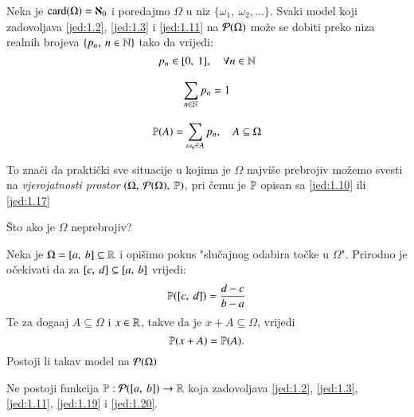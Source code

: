 \begin{pr} \label{pr:1.14}
    Neka je $\textnormal{card}({\Omega}) = \aleph_0$ i poredajmo $\Omega$ u niz $\{ \omega_1, \: \omega_2, \dots \}$.
    Svaki model koji zadovoljava \eqref{jed:1.2}, \eqref{jed:1.3} i \eqref{jed:1.11} na $\mathcal{P}({\Omega})$ mo\v ze se dobiti preko niza realnih brojeva $\{p_n, \: n \in \mathbb{N} \}$ tako da vrijedi:
    \begin{equation}   %
        p_n \in [0, \: 1], \quad \forall n \in \N
    \end{equation}

    \begin{equation}
        \sum\limits_{n \in \mathbb{N}}^{} p_n = 1
    \end{equation}

    \begin{equation} \label{jed:1.17}
        \mathbb{P}({A}) = \sum\limits_{\omega_n \in A}^{} p_n, \quad A
            \subseteq \Omega
    \end{equation}
\end{pr}

To zna\v ci da prakti\v cki sve situacije u kojima je $\Omega$ najvi\v se prebrojiv mo\v zemo svesti na \emph{vjerojatnosti prostor} $(\Omega, \: \mathcal{P}({\Omega}), \: \mathbb{P})$, pri \v cemu je $\mathbb{P}$ opisan sa \eqref{jed:1.10} ili \eqref{jed:1.17}

\v Sto ako je $\Omega$ neprebrojiv?

\begin{pr}  \label{pr:1.18}
    Neka je $\Omega = [{a}, \:{b}] \subseteq \mathbb{R}$ i opi\v simo pokus "slu\v cajnog odabira to\v cke u $\Omega$".
    Prirodno je o\v cekivati da za $[{c}, \:{d}] \subseteq [{a}, \:{b}]$ vrijedi:
    \begin{equation} \label{jed:1.19}
        \mathbb{P}({[{c}, \:{d}]}) = \frac{d - c}{b - a}
    \end{equation}
    Te za doga\dj aj $A \subseteq \Omega$ i $x \in \mathbb{R}$, takve da je
    $x + A \subseteq \Omega$, vrijedi
    \begin{equation} \label{jed:1.20}
        \mathbb{P}({x + A}) = \mathbb{P}({A}).
    \end{equation}
    Postoji li takav model na $\mathcal{P}({\Omega})$
\end{pr}

\begin{tm}
    Ne postoji funkcija $\mathbb{P}: \mathcal{P}({[{a}, \:{b}]}) \to \mathbb{R}$ koja zadovoljava \eqref{jed:1.2}, \eqref{jed:1.3}, \eqref{jed:1.11}, \eqref{jed:1.19} i \eqref{jed:1.20}.
\end{tm}

